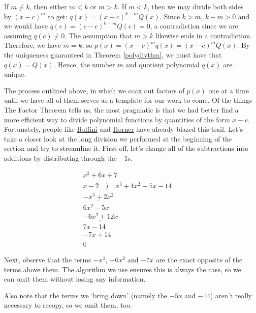 \documentclass{ximera}
\begin{document}
If $m \neq k$, then either $m<k$ or $m>k$.  If $m<k$, then we may divide both sides by $(x-c)^{m}$ to get: $q(x) = (x-c)^{k-m} Q(x)$.  Since $k>m$, $k-m>0$ and we would have $q(c) = (c-c)^{k-m} Q(c) = 0$, a contradiction since we are assuming $q(c) \neq 0$.   The assumption that $m>k$ likewise ends in a contradiction.   Therefore, we have $m = k$, so $p(x) = (x-c)^m q(x) = (x-c)^m Q(x)$.  By the uniqueness guaranteed in Theorem \ref{polydivthm}, we must have that $q(x) = Q(x)$.  Hence, the number $m$ and quotient polynomial $q(x)$ are unique. 

 

The process outlined above, in which we coax out factors of $p(x)$ one at a time until we have all of them serves as a template for our work to come. Of the things The Factor Theorem tells us, the most pragmatic is that we had better find a more efficient way to divide polynomial functions by quantities of the form $x-c$.  Fortunately, people like \href{http://en.wikipedia.org/wiki/Synthetic_division}{\underline{Ruffini}} and \href{http://en.wikipedia.org/wiki/Horner_scheme}{\underline{Horner}} have already blazed this trail.  Let's take a closer look at the long division we performed at the beginning of the section and try to streamline it.  First off, let's change all of the subtractions into additions by distributing through the $-1$s.


\setlength\arraycolsep{0.1pt}
\setlength\extrarowheight{2pt}

\[
\begin{array}{r}
 x^2 + 6x + 7 \\
 x - 2 \quad \overline{)\quad x^3 + 4x^2 - 5x - 14 \,} \\
 \underline{-x^3 + 2x^2} \phantom{- 5x - 14} \\
 6x^2 - 5x \phantom{- 14} \\
 \underline{-6x^2 + 12x} \phantom{- 14} \\
 7x - 14 \\
 \underline{-7x + 14} \\
 0
\end{array}
\]




Next, observe that the terms $-x^3$, $-6x^2$ and $-7x$ are the exact opposite of the terms above them.  The algorithm we use ensures this is always the case, so we can omit them without losing any information.

 

 Also note that the terms we `bring down' (namely the $-5x$ and $-14$) aren't really necessary to recopy, so we omit them, too.
\end{document}
